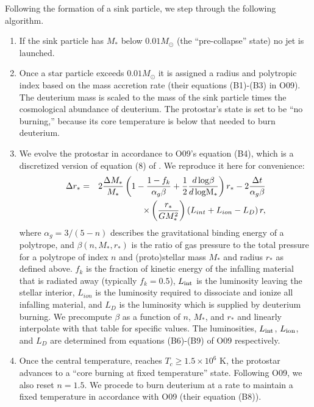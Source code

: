\documentclass[../dissertation.tex]{subfiles}
\begin{document}
Following the formation of a sink particle, we step through the following algorithm. %
\begin{enumerate}
 \item If the sink particle has $M_*$ below $0.01 M_{\odot}$ (the ``pre-collapse'' state) no jet is launched.
 \item Once a star particle exceeds $0.01 M_{\odot}$ it is assigned a radius and polytropic index based on the mass accretion rate (their equations (B1)-(B3) in O09).
The deuterium mass is scaled to the mass of the sink particle times the cosmological abundance of deuterium.
The protostar's state is set to be ``no burning,'' because its core temperature is below that needed to burn deuterium.
 \item We evolve the protostar in accordance to O09's equation (B4), which is a discretized version of equation (8) of \citet{2000ApJ...534..976N}.
We reproduce it here for convenience:
 \begin{eqnarray}
\label{eq:jet_deltaR}
\Delta r_* &=& 2 \frac{\Delta M_*}{M_*} \left( 1 - \frac{1 - f_k}{\alpha_g \beta} + \frac{1}{2} \frac{d\, \rm{log} \beta}{d\, \rm{log} M_*} \right) r_* - 2 \frac{\Delta t}{\alpha_g \beta} \nonumber\\
&&\times \left( \frac{r_*}{G M_*^2} \right) \left( L_{int} + L_{ion} - L_D \right) r,
\end{eqnarray}
where $\alpha_g = 3/(5 - n)$ describes the gravitational binding energy of a polytrope, and $\beta(n, M_*, r_*)$ is the ratio of gas pressure to the total pressure for a polytrope of index $n$ and (proto)stellar mass $M_*$ and radius $r_*$ as defined above.
$f_k$ is the fraction of kinetic energy of the infalling material that is radiated away (typically $f_k = 0.5$), $L_{\rm int}$ is the luminosity leaving the stellar interior, $L_{ion}$ is the luminosity required to dissociate and ionize all infalling material, and $L_D$ is the luminosity which is supplied by deuterium burning.
We precompute $\beta$ as a function of $n$, $M_*$, and $r_*$ and linearly interpolate with that table for specific values. The luminosities, $L_{\rm int}$, $L_{\rm ion}$, and $L_D$ are determined from equations (B6)-(B9) of O09 respectively.
\item Once the central temperature, reaches $T_c \geq 1.5\times 10^6$ K, the protostar advances to a ``core burning at fixed temperature'' state.  Following O09, we also reset $n=1.5$.  We procede to burn deuterium at a rate to maintain a fixed temperature in accordance with O09 (their equation (B8)).

\end{enumerate}
\end{document}
